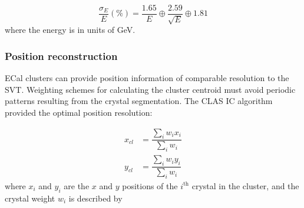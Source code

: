 \begin{equation}
\label{eq:eResUpdated}
\dfrac{\sigma_E}{E} (\%) = \dfrac{1.65}{E} \oplus \dfrac{2.59}{\sqrt{E}} \oplus 1.81 
\end{equation}
where the energy is in units of GeV.

\subsubsection{Position reconstruction}
\indent ECal clusters can provide position information of comparable resolution to the SVT. Weighting schemes for calculating the cluster centroid must avoid periodic patterns resulting from the crystal segmentation. The CLAS IC algorithm provided the optimal position resolution:~\cite{szumila-vance_hps_ecal_2014}

\begin{equation}
\begin{split}
\label{eq:posncalc}
x_{cl} & =  \dfrac{\sum_i w_i x_i}{\sum_i w_i}\\
y_{cl} & =  \dfrac{\sum_i w_i y_i}{\sum_i w_i}
\end{split}
\end{equation}
where $x_i$ and $y_i$ are the $x$ and $y$ positions of the $i^{\textrm{th}}$ crystal in the cluster, and the crystal weight $w_i$ is described by 

